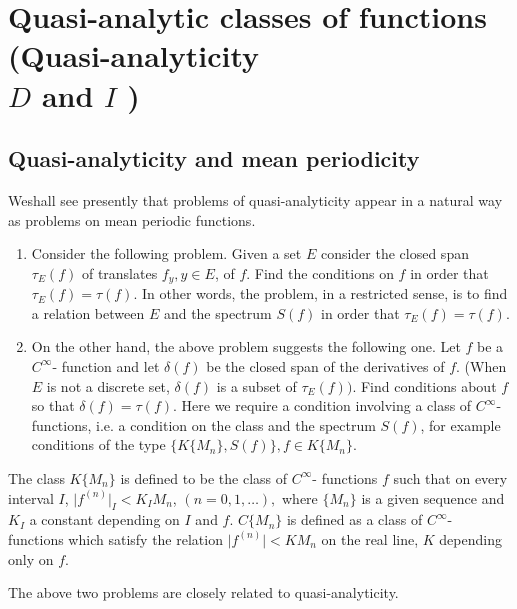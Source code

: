 \chapter[Quasi-analytic classes of functions...]{Quasi-analytic classes of functions
  (Quasi-analyticity\\ $D$ and $I$ )}\label{chap19}%

\section{Quasi-analyticity and mean periodicity}\label{chap19:sec1} %

We\pageoriginale shall see presently that problems of quasi-analyticity appear in a
natural way as problems on mean periodic functions. 
\begin{enumerate} [1.]
\item Consider the following problem. Given a set $E$ consider the
 closed span $\tau_E (f)$ of translates $f_y, y \in E$, of $f$. Find
 the conditions on $f$ in order that $\tau_E (f) = \tau (f)$. In
 other words, the problem, in a restricted sense, is to find a
 relation between $E$ and the spectrum $S(f)$ in order that $\tau_E
 (f) = \tau (f)$. 
\item On the other hand, the above problem suggests the following
 one. Let $f$ be a $C^\infty$- function and let $\delta (f)$ be the
 closed span of the derivatives of $f$. (When $E$ is not a discrete
 set, $\delta (f)$ is a subset of $\tau_E (f))$. Find conditions
 about $f$ so that $\delta (f) = \tau (f)$. Here we require a
 condition involving a class of $C^\infty$- functions, i.e. a
 condition on the class and the spectrum $S(f)$, for example
 conditions of the type $\{K \{M_n\}, S (f) \}, f \in K \big \{M_n
 \big \}$. 
\end{enumerate}

\begin{defi*} %
 The class $ K \big \{M_n \big \}$ is defined to be the class of
 $C^\infty$- functions $f$ such that on every interval $I$, $\big |
 f^{(n)} \big |_I < K_I M_n$, $(n = 0, 1, \ldots ),$ where $ \big
 \{M_n \big \}$ is a given sequence and $K_I$ a constant depending on
 $I$ and $f$. $C \big \{M_n \big \}$ is defined as a class of
 $C^\infty$- functions which satisfy the relation $\big | f^{(n)}
 \big | < KM_n$ on the real line, $K$ depending only on $f$. 
\end{defi*}

The above two problems are closely related to quasi-analyticity.

